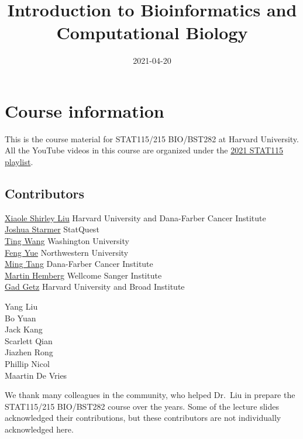 \documentclass[
]{book}
\title{Introduction to Bioinformatics and Computational Biology}
\author{}
\date{\vspace{-2.5em}2021-04-20}
\begin{document}
\maketitle

{
\setcounter{tocdepth}{1}
\tableofcontents
}
\hypertarget{course-information}{%
\chapter{Course information}\label{course-information}}

This is the course material for STAT115/215 BIO/BST282 at Harvard University.\\
All the YouTube videos in this course are organized under the \href{https://www.youtube.com/playlist?list=PLeB-Dlq-v6taAXK6ZCGfqImrNWJzFt3p3}{2021 STAT115 playlist}.

\hypertarget{contributors}{%
\section{Contributors}\label{contributors}}

\href{http://http://liulab.dfci.harvard.edu/}{Xiaole Shirley Liu} Harvard University and Dana-Farber Cancer Institute\\
\href{https://statquest.org/}{Joshua Starmer} StatQuest\\
\href{http://wang.wustl.edu/}{Ting Wang} Washington University\\
\href{http://yuelab.org/}{Feng Yue} Northwestern University\\
\href{https://divingintogeneticsandgenomics.rbind.io/}{Ming Tang} Dana-Farber Cancer Institute\\
\href{https://www.sanger.ac.uk/group/hemberg-group/}{Martin Hemberg} Wellcome Sanger Institute\\
\href{https://www.broadinstitute.org/labs/getz}{Gad Getz} Harvard University and Broad Institute

Yang Liu\\
Bo Yuan\\
Jack Kang\\
Scarlett Qian\\
Jiazhen Rong\\
Phillip Nicol\\
Maartin De Vries

We thank many colleagues in the community, who helped Dr.~Liu in prepare the STAT115/215 BIO/BST282 course over the years. Some of the lecture slides acknowledged their contributions, but these contributors are not individually acknowledged here.
\end{document}

